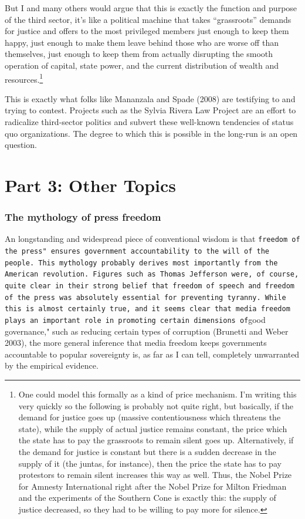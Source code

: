 \documentclass[12pt,book]{article}
\begin{document}
But I and many others would argue that this is exactly the function and
purpose of the third sector, it's like a political machine that takes
``grassroots'' demands for justice and offers to the most privileged
members just enough to keep them happy, just enough to make them leave
behind those who are worse off than themselves, just enough to keep them
from actually disrupting the smooth operation of capital, state power,
and the current distribution of wealth and resources.\footnote{One could
  model this formally as a kind of price mechanism. I'm writing this
  very quickly so the following is probably not quite right, but
  basically, if the demand for justice goes up (massive contentiousness
  which threatens the state), while the supply of actual justice remains
  constant, the price which the state has to pay the grassroots to
  remain silent goes up. Alternatively, if the demand for justice is
  constant but there is a sudden decrease in the supply of it (the
  juntas, for instance), then the price the state has to pay protestors
  to remain silent increases this way as well. Thus, the Nobel Prize for
  Amnesty International right after the Nobel Prize for Milton Friedman
  and the experiments of the Southern Cone is exactly this: the supply
  of justice decreased, so they had to be willing to pay more for
  silence.}

This is exactly what folks like Mananzala and Spade (2008) are
testifying to and trying to contest. Projects such as the Sylvia Rivera
Law Project are an effort to radicalize third-sector politics and
subvert these well-known tendencies of status quo organizations. The
degree to which this is possible in the long-run is an open question.

\section{Part 3: Other Topics}\label{part-3-other-topics}

\subsubsection{The mythology of press
freedom}\label{the-mythology-of-press-freedom}

An longstanding and widespread piece of conventional wisdom is that
\texttt{freedom of the press" ensures government accountability to the will of the people. This mythology probably derives most importantly from the American revolution. Figures such as Thomas Jefferson were, of course, quite clear in their strong belief that freedom of speech and freedom of the press was absolutely essential for preventing tyranny. While this is almost certainly true, and it seems clear that media freedom plays an important role in promoting certain dimensions of}good
governance," such as reducing certain types of corruption (Brunetti and
Weber 2003), the more general inference that media freedom keeps
governments accountable to popular sovereignty is, as far as I can tell,
completely unwarranted by the empirical evidence.
\end{document}
